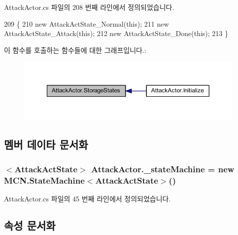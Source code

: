 Attack\+Actor.\+cs 파일의 208 번째 라인에서 정의되었습니다.


\begin{DoxyCode}
209     \{
210         \textcolor{keyword}{new} AttackActState\_Normal(\textcolor{keyword}{this});
211         \textcolor{keyword}{new} AttackActState\_Attack(\textcolor{keyword}{this});
212         \textcolor{keyword}{new} AttackActState\_Done(\textcolor{keyword}{this});
213     \}
\end{DoxyCode}


이 함수를 호출하는 함수들에 대한 그래프입니다.\+:
\nopagebreak
\begin{figure}[H]
\begin{center}
\leavevmode
\includegraphics[width=350pt]{class_attack_actor_a4c1408e09de62ad12b42bee3251556ba_icgraph}
\end{center}
\end{figure}




\subsection{멤버 데이타 문서화}
\subsubsection[{\texorpdfstring{\+\_\+state\+Machine}{_stateMachine}}]{$<${\bf Attack\+Act\+State}$>$ Attack\+Actor.\+\_\+state\+Machine = new {\bf M\+C\+N.\+State\+Machine}$<${\bf Attack\+Act\+State}$>$()\hspace{0.3cm}{\ttfamily [private]}}\hypertarget{class_attack_actor_aefebe59645532f127c1504abb12ffac8}{}\label{class_attack_actor_aefebe59645532f127c1504abb12ffac8}


Attack\+Actor.\+cs 파일의 45 번째 라인에서 정의되었습니다.



\subsection{속성 문서화}
